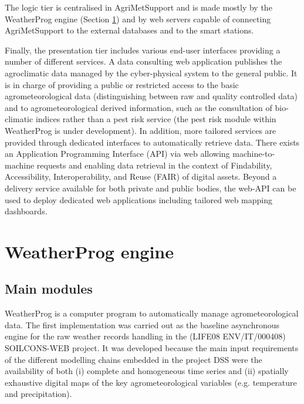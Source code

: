 \documentclass[authoryear,preprint,review,12pt]{elsarticle}
\newcommand{\note}[1]{\emph{\textcolor{red}{#1}}}
\begin{document}
The logic tier is centralised in AgriMetSupport and is made mostly by the WeatherProg engine (Section \ref{sec:weatherprog}) and by web servers capable of connecting AgriMetSupport to the external databases and to the smart stations.

Finally, the presentation tier includes various end-user interfaces providing a number of different services.
A data consulting web application publishes the agroclimatic data managed by the cyber-physical system to the general public.
It is in charge of providing a public or restricted access to the basic agrometeorological data (distinguishing between raw and quality controlled data) and to agrometeorological derived information, such as the consultation of bio-climatic indices rather than a pest risk service (the pest risk module within WeatherProg is under development).
In addition, more tailored services are provided through dedicated interfaces to automatically retrieve data. %
There exists an Application Programming Interface (API) via web allowing machine-to-machine requests and enabling data retrieval in the context of Findability, Accessibility, Interoperability, and Reuse (FAIR) of digital assets.
Beyond a delivery service available for both private and public bodies, the web-API can be used to deploy dedicated web applications including tailored web mapping dashboards.

\section{WeatherProg engine}\label{sec:weatherprog}
\subsection{Main modules}
WeatherProg \citep{langella:weatherprog2014} is a computer program to automatically manage agrometeorological data.
The first implementation was carried out as the baseline asynchronous engine for the raw weather records handling in the (LIFE08 ENV/IT/000408) SOILCONS-WEB project.
It was developed because the main input requirements of the different modelling chains embedded in the project DSS \citep{Terribile:soilconsweb:2015} were the availability of both (i) complete and homogeneous time series and (ii) spatially exhaustive digital maps of the key agrometeorological variables (e.g. temperature and precipitation).
\end{document}
